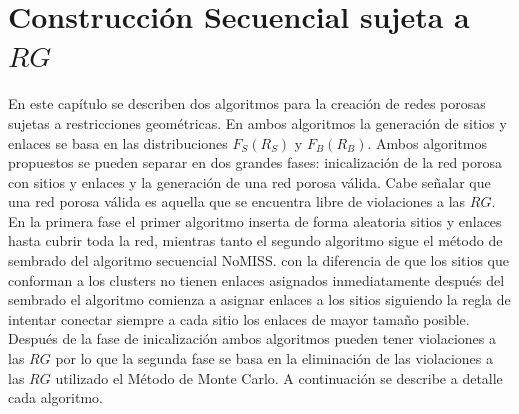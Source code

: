 \chapter{Construcción Secuencial sujeta a $RG$}
\label{champ:BSGR}
\bigskip
\barra
\bigskip



En este capítulo se describen dos algoritmos para la creación de redes porosas sujetas a restricciones geométricas. En ambos algoritmos la generación de sitios y enlaces se basa en las distribuciones $F_S(R_S)$ y $F_B(R_B)$. Ambos algoritmos propuestos se pueden separar en dos grandes fases: inicalizaci\'on de la red porosa con sitios y enlaces y la generación de una red porosa v\'alida. Cabe señalar que una red porosa v\'alida es aquella que se encuentra libre de violaciones a las $RG$. En la primera fase el primer algoritmo inserta de forma aleatoria sitios y enlaces hasta cubrir toda la red, mientras tanto el segundo algoritmo sigue el método de sembrado del algoritmo secuencial NoMISS. con la diferencia de que los sitios que conforman a los clusters no tienen enlaces asignados inmediatamente después del sembrado el algoritmo comienza a asignar enlaces a los sitios siguiendo la regla de intentar conectar siempre a cada sitio los enlaces de mayor tamaño posible. Después de la fase de inicalizaci\'on ambos algoritmos pueden tener violaciones a las $RG$ por lo que la segunda fase se basa en la eliminaci\'on de las violaciones a las $RG$ utilizado el Método de Monte Carlo. A continuación se describe a detalle cada algoritmo.

